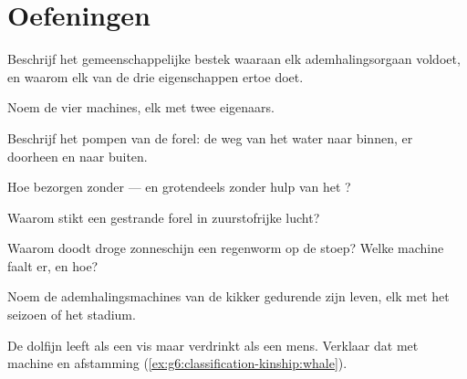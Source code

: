 \section{Oefeningen}

\begin{exercise}[$\star$]\label{exo:g7:how-animals-breathe:1}
Beschrijf het gemeenschappelijke bestek waaraan elk ademhalingsorgaan
voldoet, en waarom elk van de drie eigenschappen ertoe doet.
\end{exercise}

\begin{exercise}[$\star$]\label{exo:g7:how-animals-breathe:2}
Noem de vier machines, elk met twee eigenaars.
\end{exercise}

\begin{exercise}[$\star$]\label{exo:g7:how-animals-breathe:3}
Beschrijf het pompen van de forel: de weg van het water naar binnen, er
doorheen en naar buiten.
\end{exercise}

\begin{exercise}[$\star$]\label{exo:g7:how-animals-breathe:4}
Hoe bezorgen   zonder  --- en grotendeels zonder
hulp van het ?
\end{exercise}

\begin{exercise}[$\star$]\label{exo:g7:how-animals-breathe:5}
Waarom stikt een gestrande forel in zuurstofrijke lucht?
\end{exercise}

\begin{exercise}[$\star$]\label{exo:g7:how-animals-breathe:6}
Waarom doodt droge zonneschijn een regenworm op de stoep? Welke machine
faalt er, en hoe?
\end{exercise}

\begin{exercise}[$\star\star$]\label{exo:g7:how-animals-breathe:7}
Noem de ademhalingsmachines van de kikker gedurende zijn leven, elk met
het seizoen of het stadium.
\end{exercise}

\begin{exercise}[$\star\star$]\label{exo:g7:how-animals-breathe:8}
De dolfijn leeft als een vis maar verdrinkt als een mens. Verklaar dat met
machine en afstamming
(\cref{ex:g6:classification-kinship:whale}).
\end{exercise}

